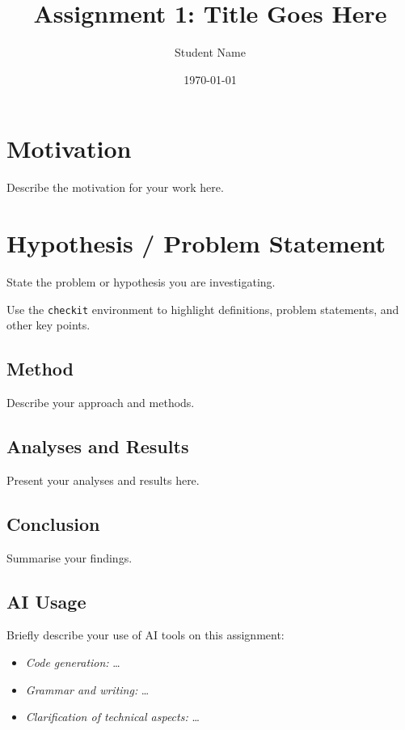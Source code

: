 \documentclass[report]{itvest}
\title{Assignment 1: Title Goes Here}
\author{Student Name}
\date{\today}
\begin{document}
\maketitle


\chapter{Motivation}

Describe the motivation for your work here.

\chapter{Hypothesis / Problem Statement}

State the problem or hypothesis you are investigating.

\begin{checkit}
  Use the \texttt{checkit} environment to highlight definitions,
  problem statements, and other key points.
\end{checkit}

\section{Method}

Describe your approach and methods.

\section{Analyses and Results}

Present your analyses and results here.

\section{Conclusion}

Summarise your findings.

\section{AI Usage}

\cite{bass_software_2021}

Briefly describe your use of AI tools on this assignment:

\begin{itemize}
  \item \emph{Code generation:} \ldots
  \item \emph{Grammar and writing:} \ldots
  \item \emph{Clarification of technical aspects:} \ldots
\end{itemize}



\end{document}
